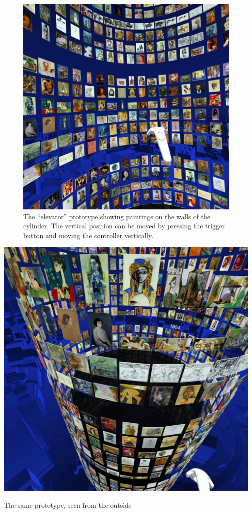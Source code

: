 \documentclass{tufte-book} %
\begin{document}
\begin{figure}
  \includegraphics{picassoinside.jpg}
  \caption{The ``elevator'' prototype showing paintings on the walls of the cylinder. The vertical position can be moved by pressing the trigger button and moving the controller vertically.}
  \label{fig:picassoinside}
\end{figure}

\begin{marginfigure}
  \includegraphics[width=\linewidth]{picassooutside.jpg}
  \caption{The same prototype, seen from the outside}
  \label{fig:picassooutside}
\end{marginfigure}
\end{document}
